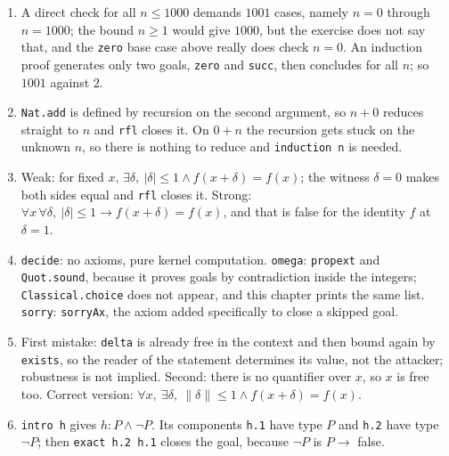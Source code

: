 \begin{enumerate}[label=\textbf{28.\arabic*}]
  \item        A direct check for all $n\le1000$ demands $1001$ cases, namely $n=0$
        through $n=1000$; the bound $n\ge1$ would give $1000$, but the exercise
        does not say that, and the \texttt{zero} base case above really does check
        $n=0$. An induction proof generates only two goals, \texttt{zero} and
        \texttt{succ}, then concludes for all $n$; so $1001$ against $2$.

  \item \texttt{Nat.add} is defined by recursion on the second argument, so
        $n+0$ reduces straight to $n$ and \texttt{rfl} closes it. On $0+n$
        the recursion gets stuck on the unknown $n$, so there is nothing
        to reduce and \texttt{induction n} is needed.

  \item 
Weak: for fixed $x$, $\exists\delta,\ |\delta|\le1\wedge f(x+\delta)=f(x)$;
        the witness $\delta=0$ makes both sides equal and \texttt{rfl} closes it.
        Strong: $\forall x\,\forall\delta,\ |\delta|\le1\to f(x+\delta)=f(x)$, and
        that is false for the identity $f$ at $\delta=1$.

  \item 
\texttt{decide}: no axioms, pure kernel computation. \texttt{omega}:
        \texttt{propext} and \texttt{Quot.sound}, because it proves goals by
        contradiction inside the integers; \texttt{Classical.choice} does not
        appear, and this chapter prints the same list. \texttt{sorry}:
        \texttt{sorryAx}, the axiom added specifically to close a skipped goal.

  \item First mistake: \texttt{delta} is already free in the context and then bound again
        by \texttt{exists}, so the reader of the statement determines its value,
        not the attacker; robustness is not implied. Second: there is no quantifier over $x$,
        so $x$ is free too. Correct version:
        $\forall x,\ \exists\delta,\ \lVert\delta\rVert\le1\wedge f(x+\delta)=f(x)$.

  \item \texttt{intro h} gives $h:P\wedge\neg P$. Its components \texttt{h.1} have type
        $P$ and \texttt{h.2} have type $\neg P$; then \texttt{exact h.2 h.1} closes
        the goal, because $\neg P$ is $P\to$ false.
\end{enumerate}

